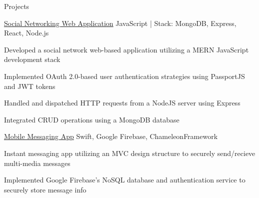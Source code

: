 \documentclass{resume} %
\newcommand{\ExternalLink}{%
    \tikz[x=1.2ex, y=1.2ex, baseline=-0.05ex]{%
        \begin{scope}[x=1ex, y=1ex]
            \clip (-0.1,-0.1) 
                --++ (-0, 1.2) 
                --++ (0.6, 0) 
                --++ (0, -0.6) 
                --++ (0.6, 0) 
                --++ (0, -1);
            \path[draw, 
                line width = 0.5, 
                rounded corners=0.5] 
                (0,0) rectangle (1,1);
        \end{scope}
        \path[draw, line width = 0.5] (0.5, 0.5) 
            -- (1, 1);
        \path[draw, line width = 0.5] (0.6, 1) 
            -- (1, 1) -- (1, 0.6);
        }
    }
\begin{document}
\begin{rSection}{Projects}
  \begin{rWorkSection}{\href{https://github.com/tharseken/Social-Networking-Web-Application}{Social Networking Web Application} }
                     {}
                    {JavaScript \textnormal{| Stack:} MongoDB, Express, React, Node.js}
                     {}
    \item Developed a social network web-based application utilizing a MERN JavaScript development stack
    \item Implemented OAuth 2.0-based user authentication strategies using PassportJS and JWT tokens
    \item Handled and dispatched HTTP requests from a NodeJS server using Express
    \item Integrated CRUD operations using a MongoDB database
  \end{rWorkSection}
  
  \vspace{-0.1em}

  \begin{rWorkSection}{\href{https://github.com/tharseken/Mobile-Messaging-Application}{Mobile Messaging App}}
                      {}
                      {Swift, Google Firebase, ChameleonFramework}
                      {}
    \item Instant messaging app utilizing an MVC design structure to securely send/recieve multi-media messages
    \item Implemented Google Firebase's NoSQL database and authentication service to securely store message info
  \end{rWorkSection}

  \vspace{-0.1em}



\end{rSection}
\end{document}
